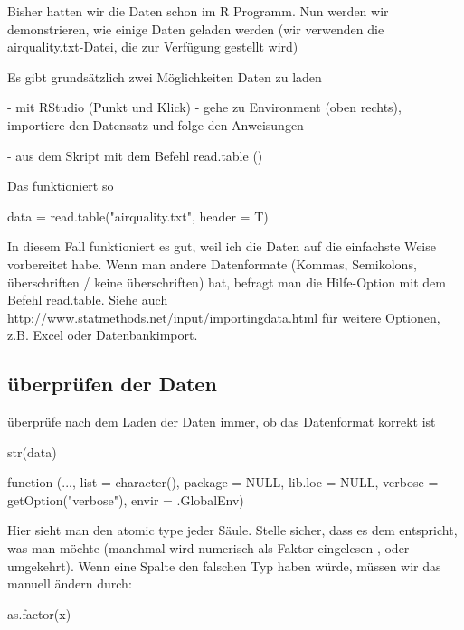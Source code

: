 \documentclass[a4paper,twoside]{tufte-book}\usepackage[]{graphicx}\usepackage[]{color}
\begin{document}
\begin{appendices}
Bisher hatten wir die Daten schon im R Programm. Nun werden wir demonstrieren, wie einige Daten geladen werden (wir verwenden die airquality.txt-Datei, die zur Verfügung gestellt wird)

Es gibt grundsätzlich zwei Möglichkeiten Daten zu laden

- mit RStudio (Punkt und Klick) - gehe zu Environment (oben rechts), importiere den Datensatz und folge den Anweisungen

- aus dem Skript mit dem Befehl read.table ()

Das funktioniert so

\begin{Schunk}
\begin{Sinput}
data = read.table("airquality.txt", header = T)
\end{Sinput}
\end{Schunk}

In diesem Fall funktioniert es gut, weil ich die Daten auf die einfachste Weise vorbereitet habe. Wenn man andere Datenformate (Kommas, Semikolons, überschriften / keine überschriften) hat, befragt man die Hilfe-Option mit dem Befehl read.table. Siehe auch http://www.statmethods.net/input/importingdata.html für weitere Optionen, z.B. Excel oder Datenbankimport.

\subsection{überprüfen der Daten}

überprüfe nach dem Laden der Daten immer, ob das Datenformat korrekt ist

\begin{Schunk}
\begin{Sinput}
str(data)
\end{Sinput}
\begin{Soutput}
function (..., list = character(), package = NULL, lib.loc = NULL, 
    verbose = getOption("verbose"), envir = .GlobalEnv)  
\end{Soutput}
\end{Schunk}

Hier sieht man den atomic type jeder Säule. Stelle sicher, dass es dem entspricht, was man möchte (manchmal wird numerisch als Faktor eingelesen , oder umgekehrt). Wenn eine Spalte den falschen Typ haben würde, müssen wir das manuell ändern durch:

\begin{Schunk}
\begin{Sinput}
as.factor(x)
\end{Sinput}
\end{Schunk}


\end{appendices}
\end{document}

